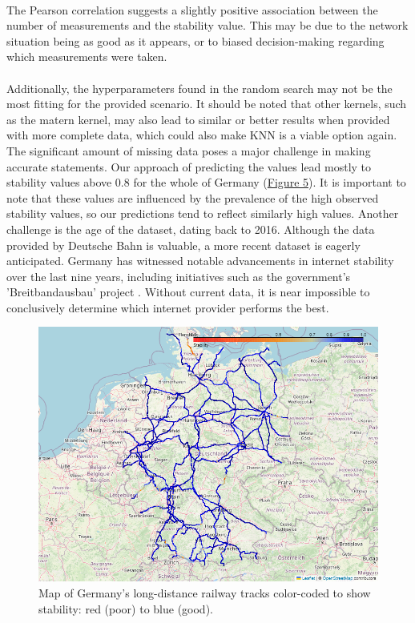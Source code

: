 \documentclass{article}
\theoremstyle{plain}
\theoremstyle{definition}
\theoremstyle{remark}
\begin{document}
\\
The Pearson correlation suggests a slightly positive association between the number of measurements and the stability value. This may be due to the network situation being as good as it appears, or to biased decision-making regarding which measurements were taken.\\
\\
Additionally, the hyperparameters found in the random
search may not be the most fitting for the provided scenario.
It should be noted that other kernels, such as the matern
kernel, may also lead to similar or better results when
provided with more complete data, which could also make
KNN is a viable option again.
\\
\newline
The significant amount of missing data poses a major challenge in making accurate statements. Our approach of predicting the values lead mostly to stability values above 0.8 for the whole of Germany (\hyperref[fig:stability-map]{Figure 5}). It is important to note that these values are influenced by the prevalence of the high observed stability values, so our predictions tend to reflect similarly high values. Another challenge is the age of the dataset, dating back to 2016. Although the data provided by Deutsche Bahn is valuable, a more recent dataset is eagerly anticipated. Germany has witnessed notable advancements in internet stability over the last nine years, including initiatives such as the government's 'Breitbandausbau' project \citep{bundesnetzagentur}. Without current data, it is near impossible to conclusively determine which internet provider performs the best.
\begin{figure}[H]
 \vskip 0.2in
 \begin{center}
\centerline{\includegraphics[width=\columnwidth]{StabilityGauss.png}}
\caption{Map of Germany's long-distance railway tracks color-coded to show stability: red (poor) to blue (good).}
 \label{fig:stability-map}
 \end{center}
 \vskip -0.2in
 \end{figure}
\end{document}
